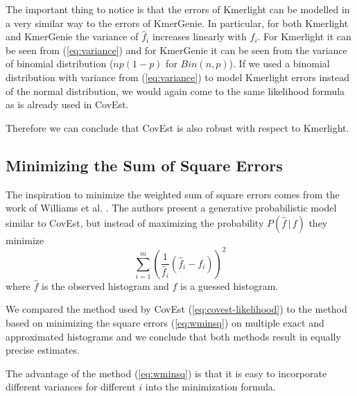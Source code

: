 The important thing to notice is that the errors of Kmerlight can be modelled in a very similar 
way to the errors of KmerGenie. In particular, for both Kmerlight and KmerGenie the variance 
of $\hat f_i$ increases linearly with $f_i$. For Kmerlight it can be seen from (\ref{eq:variance}) 
and for KmerGenie it can be seen from the variance of binomial distribution 
($np(1-p)$ for $Bin(n,p)$). If we used a binomial distribution with variance from 
(\ref{eq:variance}) to model Kmerlight errors instead of the normal distribution, we would
again come to the same likelihood formula as is already used in CovEst.

Therefore we can conclude that CovEst is also robust with respect to Kmerlight. 




\subsection{Minimizing the Sum of Square Errors}
The inspiration to minimize the weighted sum of square errors comes from the work of
Williams et al. \cite{Williams2013}. The authors present a generative probabilistic
model similar to CovEst, but instead of maximizing the probability $P(\hat f\,|\,f)$ they
minimize
\begin{equation} \label{eq:wminsq}
\sum_{i=1}^m \left(\frac{1}{\hat f_i}(\hat f_i - f_i)\right)^2
\end{equation}
where $\hat f$ is the observed histogram and $f$ is a guessed histogram.

We compared the method used by CovEst (\ref{eq:covest-likelihood}) to the method
based on minimizing the square errors (\ref{eq:wminsq}) on multiple exact and approximated
histograms and we conclude that both methods result in equally precise estimates.

\medskip

The advantage of the method (\ref{eq:wminsq}) is that it is easy to incorporate different
variances for different $i$ into the minimization formula.


